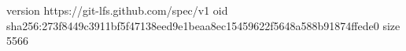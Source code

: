 version https://git-lfs.github.com/spec/v1
oid sha256:273f8449c3911bf5f47138eed9e1beaa8ec15459622f5648a588b91874ffede0
size 5566
